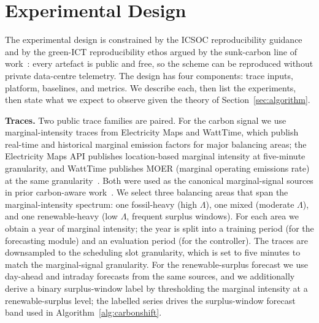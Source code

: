 \section{Experimental Design}
\label{sec:experiments}

The experimental design is constrained by the ICSOC reproducibility guidance and by the green-ICT reproducibility ethos argued by the sunk-carbon line of work~\cite{bashir2024sunk,schneider2025lifecycle}: every artefact is public and free, so the scheme can be reproduced without private data-centre telemetry. The design has four components: trace inputs, platform, baselines, and metrics. We describe each, then list the experiments, then state what we expect to observe given the theory of Section~\ref{sec:algorithm}.

\textbf{Traces.}
Two public trace families are paired. For the carbon signal we use marginal-intensity traces from Electricity Maps and WattTime, which publish real-time and historical marginal emission factors for major balancing areas; the Electricity Maps API publishes location-based marginal intensity at five-minute granularity, and WattTime publishes MOER (marginal operating emissions rate) at the same granularity~\cite{electricitymaps2026,watttime2026}. Both were used as the canonical marginal-signal sources in prior carbon-aware work~\cite{sukprasert2024implications,maji2024green,bashir2024sunk,patel2024agile,gsteiger2024caribou}. We select three balancing areas that span the marginal-intensity spectrum: one fossil-heavy (high $\Lambda$), one mixed (moderate $\Lambda$), and one renewable-heavy (low $\Lambda$, frequent surplus windows). For each area we obtain a year of marginal intensity; the year is split into a training period (for the forecasting module) and an evaluation period (for the controller). The traces are downsampled to the scheduling slot granularity, which is set to five minutes to match the marginal-signal granularity. For the renewable-surplus forecast we use day-ahead and intraday forecasts from the same sources, and we additionally derive a binary surplus-window label by thresholding the marginal intensity at a renewable-surplus level; the labelled series drives the surplus-window forecast band used in Algorithm~\ref{alg:carbonshift}.

